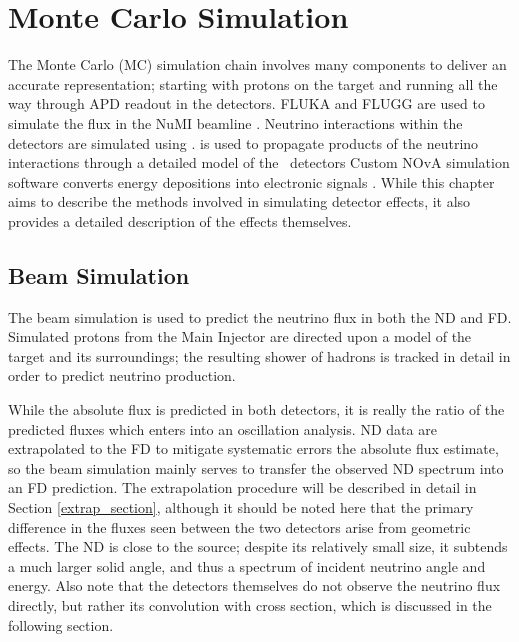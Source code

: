 \chapter{Monte Carlo Simulation}
\label{sim_chapter}


The \nova Monte Carlo (MC) simulation chain involves many components to deliver an accurate representation; starting with protons on the \numi target and running all the way through APD readout in the \nova detectors.  FLUKA and FLUGG are used to simulate the flux in the NuMI beamline \cite{fluka}.
Neutrino interactions within the detectors are simulated using \genie
\cite{genie}.
\geant is used to propagate products of the neutrino interactions through a detailed model of the \nova~detectors \cite{geant}
Custom NOvA simulation software converts energy depositions into electronic signals \cite{aurisano2015nova}.
While this chapter aims to describe the methods involved in simulating detector effects, it also provides a detailed description of the
effects themselves.


\section{Beam Simulation}
\label{beam_sim_section}

The \numi beam simulation is used to predict the neutrino flux
in both the ND and FD.
Simulated protons from the Main Injector are directed upon a model of the
target and its surroundings; the resulting shower of hadrons
is tracked in detail in order to predict neutrino production.

While the absolute flux is predicted in both detectors,
it is really the ratio of the predicted fluxes which enters into an oscillation
analysis.
ND data are extrapolated to the FD to mitigate systematic errors
the absolute flux estimate, so the beam simulation mainly serves
to transfer the observed ND spectrum into an FD prediction.
The extrapolation procedure will be described in detail in Section
\ref{extrap_section}, although it should be noted here that the primary
difference in the fluxes seen between the two detectors arise from geometric
effects.
The ND is close to the \numi source; despite its relatively small size,
it subtends a much larger solid angle, and thus a spectrum of incident
neutrino angle and energy.
Also note that the detectors themselves do not observe the neutrino flux
directly, but rather its convolution with cross section, which is discussed
in the following section.

